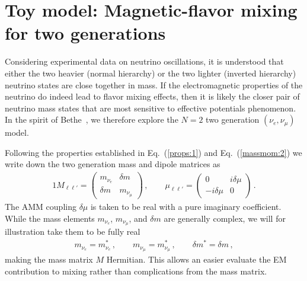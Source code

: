 \documentclass[addchapnum]{ws-rv961x669} %
\newcommand{\req}[1]{Eq.~(\ref{#1})}
\begin{document}
\section{Toy model: Magnetic-flavor mixing for two generations}
\label{sec:mix}
Considering experimental data on neutrino oscillations, it is understood that either the two heavier (normal hierarchy) or the two lighter (inverted hierarchy) neutrino states are close together in mass. If the electromagnetic properties of the neutrino do indeed lead to flavor mixing effects, then it is likely the closer pair of neutrino mass states that are most sensitive to effective potentials phenomenon. In the spirit of Bethe~\cite{Bethe:1986ej}, we therefore explore the $N=2$ two generation $(\nu_{e},\nu_{\mu})$ model.

Following the properties established in \req{props:1} and \req{massmom:2} we write down the two generation mass and dipole matrices as
\begin{alignat}{1}
	\label{mix:1} M_{\ell\ell'}= 
	\begin{pmatrix}
		m_{\nu_{e}} & {\delta m}\\
		{\delta m} & m_{\nu_{\mu}}
	\end{pmatrix}\,,\qquad
	\mu_{\ell\ell'} = 
	\begin{pmatrix}
		0 & i\delta\mu\\
		-i\delta\mu & 0
	\end{pmatrix}\,.
\end{alignat}
The AMM coupling $\delta\mu$ is taken to be real with a pure imaginary coefficient. While the mass elements $m_{\nu_{e}}$, $m_{\nu_{\mu}}$, and ${\delta m}$ are generally complex, we will for illustration take them to be fully real
\begin{align}
    m_{\nu_{e}}=m_{\nu_{e}}^{*}\,,\qquad
    m_{\nu_{\mu}}=m_{\nu_{\mu}}^{*}\,,\qquad
    \delta m^{*}=\delta m\,,
\end{align}
making the mass matrix $M$ Hermitian. This allows an easier evaluate the EM contribution to mixing rather than complications from the mass matrix.
\end{document}
